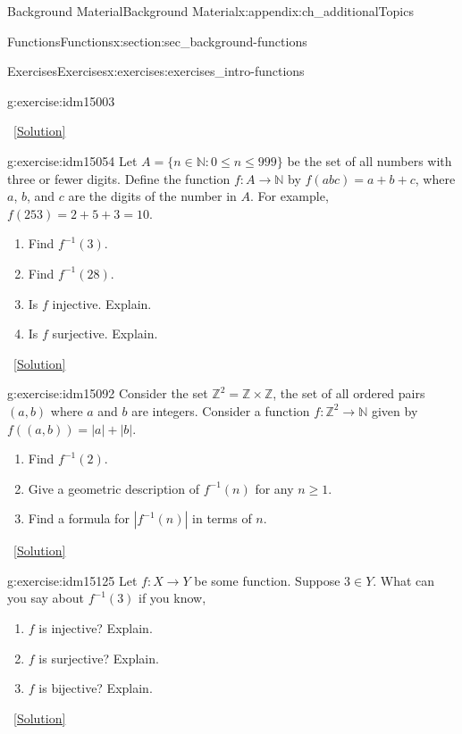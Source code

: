 \documentclass[oneside,10pt,]{book}
\numberwithin{equation}{chapter}
\def\N{\mathbb N}
\def\Z{\mathbb Z}
\def\inv{^{-1}}
\def\st{:}
\begin{document}
\begin{appendixptx}{Background Material}{}{Background Material}{}{}{x:appendix:ch_additionalTopics}
\begin{sectionptx}{Functions}{}{Functions}{}{}{x:section:sec_background-functions}
\begin{exercises-subsection}{Exercises}{}{Exercises}{}{}{x:exercises:exercises_intro-functions}
\begin{divisionexercise}{6}{}{}{g:exercise:idm15003}
\begin{enumerate}[label=(\alph*)]
\end{enumerate}
%
\qquad~\hfill{\tiny\hyperlink{g:solution:idm15027-main}{[Solution]}}\end{divisionexercise}%
\begin{divisionexercise}{7}{}{}{g:exercise:idm15054}%
Let \(A = \{n \in \N \st 0 \le n \le 999\}\) be the set of all numbers with three or fewer digits. Define the function \(f:A \to \N\) by \(f(abc) = a+b+c\), where \(a\), \(b\), and \(c\) are the digits of the number in \(A\). For example, \(f(253) = 2 + 5 + 3 =  10\).%
\begin{enumerate}[label=(\alph*)]
\item{}Find \(f\inv(3)\).%
\item{}Find \(f\inv(28)\).%
\item{}Is \(f\) injective. Explain.%
\item{}Is \(f\) surjective. Explain.%
\end{enumerate}
%
\qquad~\hfill{\tiny\hyperlink{g:solution:idm15078-main}{[Solution]}}\end{divisionexercise}%
\begin{divisionexercise}{8}{}{}{g:exercise:idm15092}%
Consider the set \(\Z^2 = \Z \times \Z\), the set of all ordered pairs \((a,b)\) where \(a\) and \(b\) are integers.  Consider a function \(f: \Z^2 \to \N\) given by \(f((a,b)) = |a| + |b|\).%
\begin{enumerate}[label=(\alph*)]
\item{}Find \(f\inv(2)\).%
\item{}Give a geometric description of \(f\inv(n)\) for any \(n \ge 1\).%
\item{}Find a formula for \(|f\inv(n)|\) in terms of \(n\).%
\end{enumerate}
%
\qquad~\hfill{\tiny\hyperlink{g:solution:idm15113-main}{[Solution]}}\end{divisionexercise}%
\begin{divisionexercise}{9}{}{}{g:exercise:idm15125}%
Let \(f:X \to Y\) be some function. Suppose \(3 \in Y\). What can you say about \(f\inv(3)\) if you know,%
\begin{enumerate}[label=(\alph*)]
\item{}\(f\) is injective? Explain.%
\item{}\(f\) is surjective? Explain.%
\item{}\(f\) is bijective? Explain.%
\end{enumerate}
%
\qquad~\hfill{\tiny\hyperlink{g:solution:idm15141-main}{[Solution]}}\end{divisionexercise}%

\end{exercises-subsection}
\end{sectionptx}
\end{appendixptx}
\end{document}
